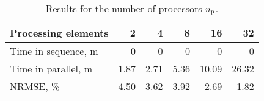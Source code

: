 \begin{table}[h]
  \centering
  \caption{Results for the number of processors ${n_\text{p}}$.}
  \begin{tabular*}{0.90\linewidth}{lrrrrr}
    \toprule
    Processing elements & 2 & 4 & 8 & 16 & 32 \\
    \midrule
    Time in sequence, m & 0 & 0 & 0 & 0 & 0 \\
    Time in parallel, m & 1.87 & 2.71 & 5.36 & 10.09 & 26.32 \\
    NRMSE, \%           & 4.50 & 3.62 & 3.92 &  2.69 &  1.82 \\
    \bottomrule
  \end{tabular*}
  \vspace{-1em}
\end{table}
